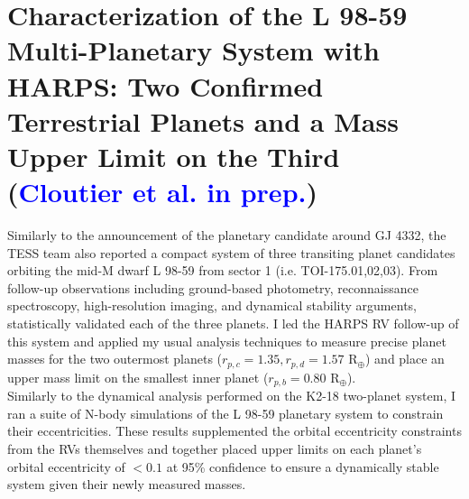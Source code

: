 \section{Characterization of the L 98-59 Multi-Planetary System with HARPS:
  Two Confirmed Terrestrial Planets and a Mass Upper Limit on the Third
  (\textcolor{blue}{Cloutier et al. in prep.})}
Similarly to the announcement of the planetary candidate around GJ 4332, the
TESS team also reported a compact system of three transiting planet
candidates orbiting the mid-M dwarf L 98-59 from sector 1 (i.e.
TOI-175.01,02,03). From follow-up observations including ground-based
photometry, reconnaissance spectroscopy, high-resolution imaging, and
dynamical stability arguments, \cite{kostov19} statistically validated each of
the three planets. I led the HARPS RV follow-up of this system and applied my
usual analysis techniques to measure precise planet masses for the two outermost
planets ($r_{p,c}=1.35, r_{p,d}=1.57$ R$_{\oplus}$) and place an upper mass limit
on the smallest inner planet ($r_{p,b}=0.80$ R$_{\oplus}$). \\

Similarly to the dynamical analysis performed on the K2-18 two-planet system, I
ran a suite of N-body simulations of the L 98-59 planetary system to constrain
their eccentricities. These results supplemented the orbital eccentricity
constraints from the RVs themselves and together placed upper limits on each
planet's orbital eccentricity of $< 0.1$ at 95\% confidence to ensure a
dynamically stable system given their newly measured masses.
